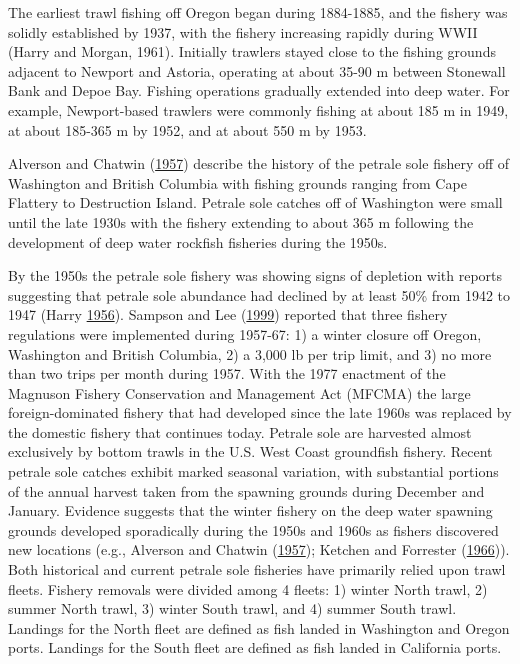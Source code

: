 \documentclass[12pt,]{article}
\begin{document}
The earliest trawl fishing off Oregon began during 1884-1885, and the
fishery was solidly established by 1937, with the fishery increasing
rapidly during WWII (Harry and Morgan, 1961). Initially trawlers stayed
close to the fishing grounds adjacent to Newport and Astoria, operating
at about 35-90 m between Stonewall Bank and Depoe Bay. Fishing
operations gradually extended into deep water. For example,
Newport-based trawlers were commonly fishing at about 185 m in 1949, at
about 185-365 m by 1952, and at about 550 m by 1953.

Alverson and Chatwin
(\protect\hyperlink{ref-alverson_results_1957}{1957}) describe the
history of the petrale sole fishery off of Washington and British
Columbia with fishing grounds ranging from Cape Flattery to Destruction
Island. Petrale sole catches off of Washington were small until the late
1930s with the fishery extending to about 365 m following the
development of deep water rockfish fisheries during the 1950s.

By the 1950s the petrale sole fishery was showing signs of depletion
with reports suggesting that petrale sole abundance had declined by at
least 50\% from 1942 to 1947 (Harry
\protect\hyperlink{ref-harry_analysis_1956}{1956}). Sampson and Lee
(\protect\hyperlink{ref-sampson_assessment_1999}{1999}) reported that
three fishery regulations were implemented during 1957-67: 1) a winter
closure off Oregon, Washington and British Columbia, 2) a 3,000 lb per
trip limit, and 3) no more than two trips per month during 1957. With
the 1977 enactment of the Magnuson Fishery Conservation and Management
Act (MFCMA) the large foreign-dominated fishery that had developed since
the late 1960s was replaced by the domestic fishery that continues
today. Petrale sole are harvested almost exclusively by bottom trawls in
the U.S. West Coast groundfish fishery. Recent petrale sole catches
exhibit marked seasonal variation, with substantial portions of the
annual harvest taken from the spawning grounds during December and
January. Evidence suggests that the winter fishery on the deep water
spawning grounds developed sporadically during the 1950s and 1960s as
fishers discovered new locations (e.g., Alverson and Chatwin
(\protect\hyperlink{ref-alverson_results_1957}{1957}); Ketchen and
Forrester (\protect\hyperlink{ref-ketchen_population_1966}{1966})). Both
historical and current petrale sole fisheries have primarily relied upon
trawl fleets. Fishery removals were divided among 4 fleets: 1) winter
North trawl, 2) summer North trawl, 3) winter South trawl, and 4) summer
South trawl. Landings for the North fleet are defined as fish landed in
Washington and Oregon ports. Landings for the South fleet are defined as
fish landed in California ports.
\end{document}

